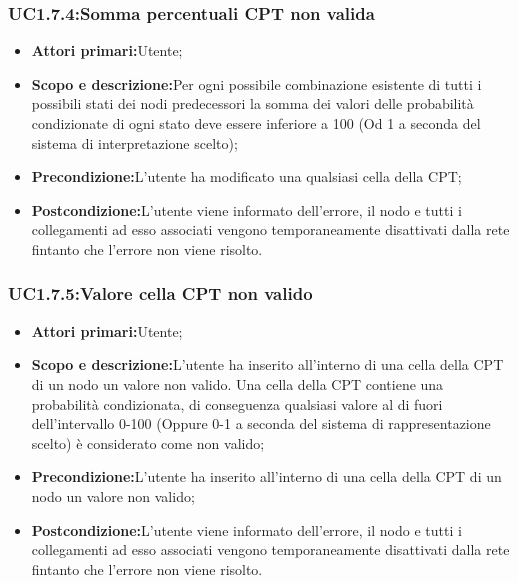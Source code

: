 \subsubsection{UC1.7.4:Somma percentuali CPT non valida}
\begin{itemize}
	\item{\textbf{Attori primari:}Utente;}
	\item{\textbf{Scopo e descrizione:}Per ogni possibile combinazione esistente di tutti i possibili stati dei nodi predecessori la somma dei valori delle probabilità condizionate di ogni stato deve essere inferiore a 100 (Od 1 a seconda del sistema di interpretazione scelto);}
	\item{\textbf{Precondizione:}L'utente ha modificato una qualsiasi cella della CPT;}
	\item{\textbf{Postcondizione:}L'utente viene informato dell'errore, il nodo e tutti i collegamenti ad esso associati vengono temporaneamente disattivati dalla rete fintanto che l'errore non viene risolto.}
\end{itemize}
\subsubsection{UC1.7.5:Valore cella CPT non valido}
\begin{itemize}
	\item{\textbf{Attori primari:}Utente;}
	\item{\textbf{Scopo e descrizione:}L'utente ha inserito all'interno di una cella della CPT di un nodo un valore non valido. Una cella della CPT contiene una probabilità condizionata, di conseguenza qualsiasi valore al di fuori dell'intervallo 0-100 (Oppure 0-1 a seconda del sistema di rappresentazione scelto) è considerato come non valido;}
	\item{\textbf{Precondizione:}L'utente ha inserito all'interno di una cella della CPT di un nodo un valore non valido;}
	\item{\textbf{Postcondizione:}L'utente viene informato dell'errore, il nodo e tutti i collegamenti ad esso associati vengono temporaneamente disattivati dalla rete fintanto che l'errore non viene risolto.}
\end{itemize}
